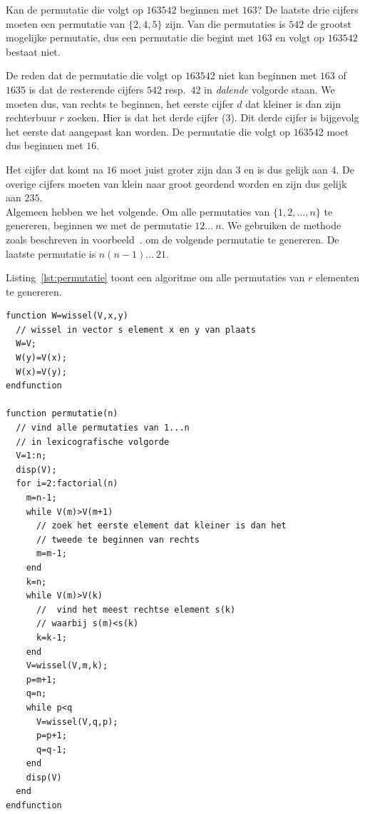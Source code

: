 Kan de permutatie die volgt op $163542$ beginnen met $163$? De laatste drie cijfers moeten een permutatie van $\{2,4,5\}$ zijn. Van die permutaties is $542$ de grootst mogelijke permutatie, dus een permutatie die begint met  $163$ en volgt op $163542$ bestaat niet.

De reden dat de permutatie die volgt op $163542$ niet kan beginnen met $163$ of $1635$ is dat de resterende cijfers $542$ resp.\ $42$ in \emph{dalende} volgorde staan. We moeten dus, van rechts te beginnen,  het eerste cijfer $d$ dat kleiner is dan zijn rechterbuur $r$ zoeken. Hier is dat het derde cijfer (3). Dit derde cijfer is bijgevolg het eerste dat aangepast kan worden. De permutatie die volgt op $163542$ moet dus beginnen met $16$.

Het cijfer dat komt na $16$ moet juist groter zijn dan $3$ en is dus gelijk aan $4$. De overige cijfers moeten van klein naar groot geordend worden en zijn dus gelijk aan $235$.\\

Algemeen hebben we het volgende. Om alle permutaties van $\{1,2,\dots,n\}$ te genereren, beginnen we met de permutatie $12\dots\ n$. We gebruiken de methode zoals beschreven in voorbeeld~\thesection. om de volgende permutatie te genereren. De laatste permutatie is $n(n-1)\dots\ 21$. 

Listing~\ref{lst:permutatie} toont een algoritme om alle permutaties van $r$ elementen te genereren.

\begin{lstlisting}[caption={Algoritme om alle permutaties van $r$ elementen te genereren}, label={lst:permutatie}]
function W=wissel(V,x,y)
  // wissel in vector s element x en y van plaats
  W=V;
  W(y)=V(x);
  W(x)=V(y);
endfunction

function permutatie(n)
  // vind alle permutaties van 1...n 
  // in lexicografische volgorde
  V=1:n;
  disp(V);
  for i=2:factorial(n)
    m=n-1;
    while V(m)>V(m+1)
      // zoek het eerste element dat kleiner is dan het
      // tweede te beginnen van rechts
      m=m-1;
    end
    k=n;
    while V(m)>V(k)
      //  vind het meest rechtse element s(k)
      // waarbij s(m)<s(k)
      k=k-1;
    end
    V=wissel(V,m,k);
    p=m+1;
    q=n;
    while p<q
      V=wissel(V,q,p);
      p=p+1;
      q=q-1;
    end
    disp(V)
  end
endfunction
\end{lstlisting}

